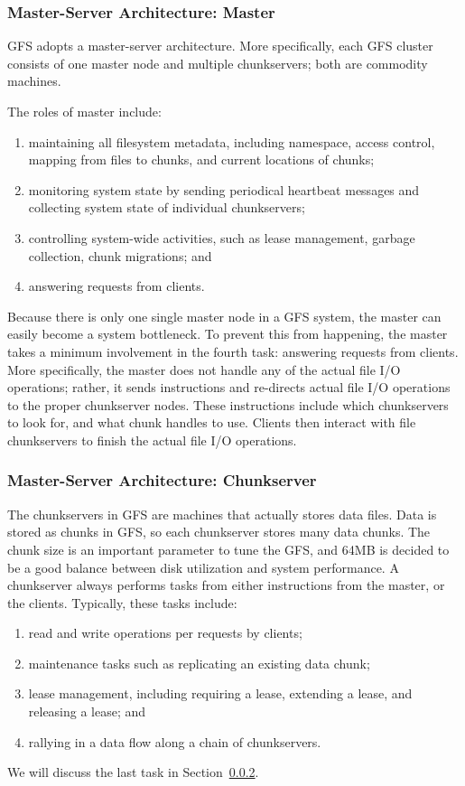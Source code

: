 \subsubsection{Master-Server Architecture: Master}
GFS adopts a master-server architecture.
%
More specifically, each GFS cluster consists of one master node and 
multiple chunkservers; both are commodity machines.

The roles of master include:
\begin{enumerate}
\item maintaining all filesystem metadata, including
	namespace, access control, mapping from files to chunks, and current
	locations of chunks;
\item monitoring system state by sending periodical heartbeat messages and 
	collecting system state of individual chunkservers;
\item controlling system-wide activities, such as lease management, 
	garbage collection, chunk migrations; and
\item answering requests from clients.
\end{enumerate}

Because there is only one single master node in a GFS system, the master can
easily become a system bottleneck.
%
To prevent this from happening, the master takes a minimum involvement
in the fourth task: answering requests from clients.
%
More specifically, the master does not handle any of the actual file I/O
operations; rather, it sends instructions and re-directs actual file I/O 
operations to the proper chunkserver nodes.
%
These instructions include which chunkservers to look for, and what chunk 
handles to use.
%
Clients then interact with file chunkservers to finish the actual file I/O 
operations.


\subsubsection{Master-Server Architecture: Chunkserver}
The chunkservers in GFS are machines that actually stores data files.
%
Data is stored as chunks in GFS, so each chunkserver stores many data chunks.
%
The chunk size is an important parameter to tune the GFS, and 
64MB is decided to be a good balance between disk utilization and 
system performance.
%
A chunkserver always performs tasks from either instructions from the 
master, or the clients. 
%
Typically, these tasks include:
%
\begin{enumerate}
\item read and write operations per requests by clients;
\item maintenance tasks such as replicating an existing data chunk;
\item lease management, including requiring a lease, extending a lease, 
	and releasing a lease; and
\item rallying in a data flow along a chain of chunkservers. 
\end{enumerate}
%
We will discuss the last task in Section~\ref{}.

